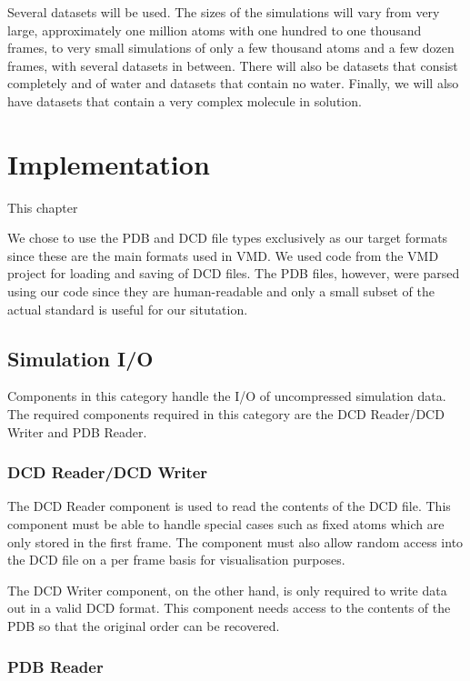 \documentclass[a4paper,11pt]{report}
\begin{document}
Several datasets will be used. The sizes of the simulations will vary from very large, approximately one million atoms with one hundred to one thousand frames, to very small simulations of only a few thousand atoms and a few dozen frames, with several datasets in between. There will also be datasets that consist completely and of water and datasets that contain no water. Finally, we will also have datasets that contain a very complex molecule in solution.

\chapter{Implementation}

This chapter 

We chose to use the PDB and DCD file types exclusively as our target formats since these are the main formats used in VMD. We used code from the VMD project for loading and saving of DCD files. The PDB files, however, were parsed using our code since they are human-readable and only a small subset of the actual standard is useful for our situtation.

\section{Simulation I/O}

Components in this category handle the I/O of uncompressed simulation data. The required components required in this category are the DCD Reader/DCD Writer and PDB Reader.

\subsection{DCD Reader/DCD Writer}

The DCD Reader component is used to read the contents of the DCD file. This component must be able to handle special cases such as fixed atoms which are only stored in the first frame. The component must also allow random access into the DCD file on a per frame basis for visualisation purposes.

The DCD Writer component, on the other hand, is only required to write data out in a valid DCD format. This component needs access to the contents of the PDB so that the original order can be recovered.

\subsection{PDB Reader}
\end{document}
